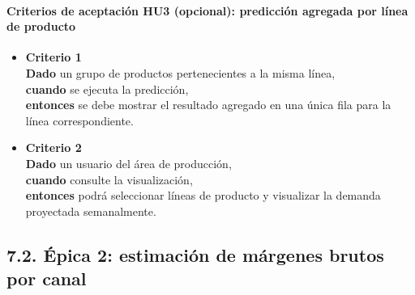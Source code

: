 \documentclass[
11pt, %
]{charter}
\begin{document}
\vspace{1em}

\paragraph{Criterios de aceptación HU3 (opcional): predicción agregada por línea de producto}
\begin{itemize}
  \item \textbf{Criterio 1} \\
  \textbf{Dado} un grupo de productos pertenecientes a la misma línea, \\
  \textbf{cuando} se ejecuta la predicción, \\
  \textbf{entonces} se debe mostrar el resultado agregado en una única fila para la línea correspondiente.

  \item \textbf{Criterio 2} \\
  \textbf{Dado} un usuario del área de producción, \\
  \textbf{cuando} consulte la visualización, \\
  \textbf{entonces} podrá seleccionar líneas de producto y visualizar la demanda proyectada semanalmente.
\end{itemize}

\subsection*{7.2. Épica 2: estimación de márgenes brutos por canal}
\end{document}
